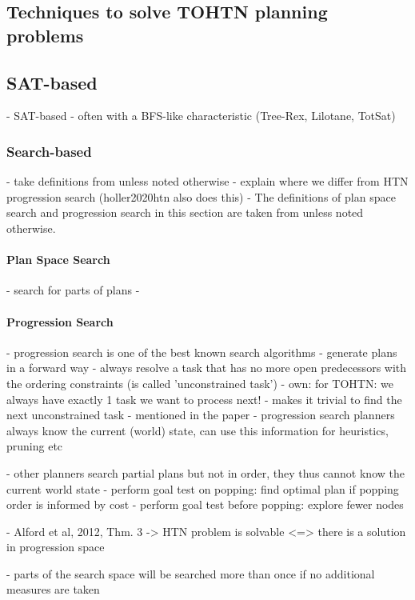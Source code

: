 \subsection{Techniques to solve TOHTN planning problems}

\subsection{SAT-based}
- SAT-based
- often with a BFS-like characteristic (Tree-Rex, Lilotane, TotSat)

\subsubsection{Search-based}
- take definitions from \cite{holler2020htn} unless noted otherwise
- explain where we differ from HTN progression search (holler2020htn also does this)
- 
The definitions of plan space search and progression search in this section are taken from \cite{holler2020htn} unless noted otherwise.

\paragraph{Plan Space Search}
- search for parts of plans
- 

\paragraph{Progression Search}
\cite{holler2020htn}
	- progression search is one of the best known search algorithms
	- generate plans in a forward way
	- always resolve a task that has no more open predecessors with the ordering constraints (is called 'unconstrained task')
		- own: for TOHTN: we always have exactly 1 task we want to process next!
		- makes it trivial to find the next unconstrained task
		- mentioned in the paper
	- progression search planners always know the current (world) state, can use this information for heuristics, pruning etc
	
	- other planners search partial plans but not in order, they thus cannot know the current world state
	- perform goal test on popping: find optimal plan if popping order is informed by cost
	- perform goal test before popping: explore fewer nodes
	
	- Alford et al, 2012, Thm. 3 -> HTN problem is solvable <=> there is a solution in progression space
	
	- parts of the search space will be searched more than once if no additional measures are taken
	
